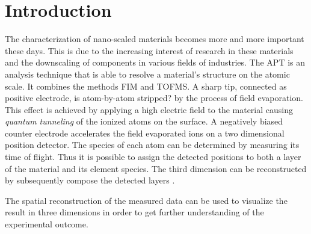 \chapter{Introduction}
\label{sec:introduction}

%

The characterization of nano-scaled materials becomes more and more important these days. This is due to the increasing interest of research in these materials and the downscaling of components in various fields of industries. %
The \ac{APT} is an analysis technique that is able to resolve a material's structure on the atomic scale. 
It combines the methods \ac{FIM} and \ac{TOFMS}.%
A sharp tip, connected as positive electrode, is atom-by-atom stripped? by the process of field evaporation. This effect is achieved by applying a high electric field to the material causing \emph{quantum tunneling} of the ionized atoms on the surface.%
A negatively biased counter electrode accelerates the field evaporated ions on a two dimensional position detector. The species of each atom can be determined by measuring its time of flight. Thus it is possible to assign the detected positions to both a layer of the material and its element species. The third dimension can be reconstructed by subsequently compose the detected layers \cite{Hel02}. %

The spatial reconstruction of the measured data can be used to visualize the result in three dimensions in order to get further understanding of the experimental outcome.